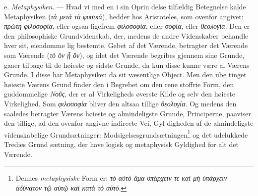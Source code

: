 \documentclass[12pt,a4paper]{book}
\newcommand{\gk}[1]{\textit{#1}}
\begin{document}
e. \emph{Metaphysiken}. --- Hvad vi med en i sin Oprin\-%
delse tilfældig Betegnelse kalde Metaphysiken (\gk{τὰ μετὰ τὰ}
\gk{φυσικά}), hedder hos Aristoteles, som ovenfor angivet: \gk{πρώτη}
\gk{φιλοσοφία}, eller ogsaa ligefrem \gk{φιλοσοφία}, eller \gk{σοφία}, eller
\gk{θεολογία}. Den er den philosophiske Grundvidenskab, der,
medens de andre Videnskaber behandle hver sit, eiendomme\-%
lig bestemte, Gebet af det Værende, betragter det Værende
som Værende (\gk{τὸ ὄν ᾗ ὄν}), og idet det Værende begribes
gjennem sine Grunde, gaaer tilbage til de høieste og sidste
Grunde, da kun disse kunne være al Værens Grunde. I disse
har Metaphysiken da sit væsentlige Object. Men den ube\-%
tinget høieste Værens Grund finder den i Begrebet om den
rene stoffrie Form, den guddommelige \gk{Νοῦς}, der er al Virkeligheds
øverste Kilde og selv den høieste Virkelighed. Som \gk{φιλοσοφία}
bliver den altsaa tillige \gk{θεολογία}. Og medens den saaledes
betragter Værens høieste og almindeligste Grunde, Principerne,
paaviser den tillige, ad den ovenfor angivne indirecte Vei, Gyl\-%
digheden af de almindeligste videnskabelige Grundsætninger:
Modsigelsesgrundsætningen\footnote{Dennes \emph{metaphysiske} Form er: \gk{τὸ αὐτὸ ἅμα ὑπάρχειν τε καὶ μὴ ὑπάρχειν ἀδύνατον τῷ αὐτῷ καὶ κατὰ τὸ αὐτό}.} og det udelukkede Tredies Grund\-%
sætning, der have logisk og metaphysisk Gyldighed for alt
det Værende.
\end{document}
